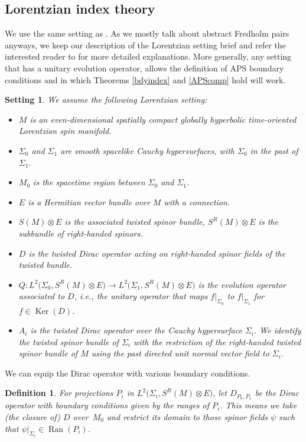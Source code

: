 \documentclass[10pt,a4paper]{amsart}
\numberwithin{equation}{section}
\newtheorem{Setting}[Theorem]{Setting}
\newtheorem{Definition}[Theorem]{Definition}
\DeclareMathOperator{\Ran}{Ran}
\DeclareMathOperator{\Ker}{Ker}
\begin{document}
	\subsection{Lorentzian index theory}
	\label{Lorentzintro}
	We use the same setting as \cite{BH}. As we mostly talk about abstract Fredholm pairs anyways, we keep our description of the Lorentzian setting brief and refer the interested reader to \cite[Section~2]{BH} for more detailed explanations. More generally, any setting that has a unitary evolution operator, allows the definition of APS boundary conditions and  in which Theorems \ref{bdyindex} and \ref{APScomp} hold will work.

	\begin{Setting}
We assume the following Lorentzian setting:
	\begin{itemize}\itemsep=0pt
            \item $M$ is an even-dimensional spatially compact globally hyperbolic time-oriented Lorentzian spin manifold.
			\item $\Sigma_0$ and $\Sigma_1$ are smooth spacelike Cauchy hypersurfaces, with $\Sigma_0$ in the past of $\Sigma_1$.
			\item $M_0$ is the spacetime region between $\Sigma_0$ and $\Sigma_1$.
			\item $E$ is a Hermitian vector bundle over $M$ with a connection.
			\item $S(M)\otimes E$ is the associated twisted spinor bundle, $S^R(M)\otimes E$ is the subbundle of right-handed spinors.
			\item $D$ is the twisted Dirac operator acting on right-handed spinor fields of the twisted bundle.
			\item $Q\colon L^2\bigl(\Sigma_0,S^R(M)\otimes E\bigr)\rightarrow L^2\bigl(\Sigma_1,S^R(M)\otimes E\bigr)$ is the evolution operator associated to $D$, i.e., the unitary operator that maps $f|_{\Sigma_0}$ to $f|_{\Sigma_1}$ for $f\in\Ker(D)$.
			\item $A_i$ is the twisted Dirac operator over the Cauchy hypersurface $\Sigma_i$. We identify the twisted spinor bundle of $\Sigma_i$ with the restriction of the right-handed twisted spinor bundle of $M$ using the past directed unit normal vector field to $\Sigma_i$.
		\end{itemize}
	\end{Setting}
	We can equip the Dirac operator with various boundary conditions.
	\begin{Definition}
		For projections $P_i$ in $L^2\bigl(\Sigma_i,S^R(M)\otimes E\bigr)$, let $D_{P_0,P_1}$ be the Dirac operator with boundary conditions given by the ranges of $P_i$. This means we take (the closure of) $D$ over~$M_0$ and restrict its domain to those spinor fields $\psi$ such that $\psi|_{\Sigma_i}\in \Ran(P_i)$.
	\end{Definition}
\end{document}
